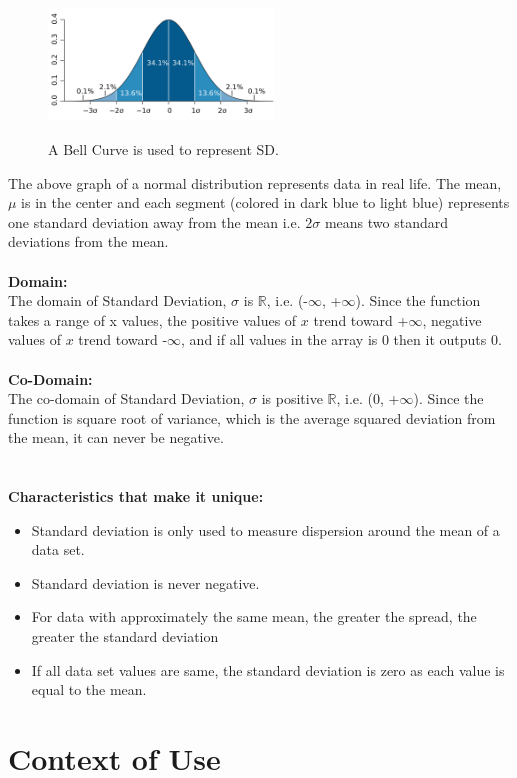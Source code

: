 \documentclass[12pt,letterpaper]{report}
\begin{document}
\begin{figure}[h]
 \centering
 \includegraphics[width= 6cm]{images/Standarddev.png}
  \caption{A Bell Curve is used to represent SD.}\cite{definition}
\end{figure}

\normalsize{The above graph of a normal distribution represents data in real life. The mean, $\mu$ is in the center and each segment (colored in dark blue to light blue) represents one standard deviation away from the mean i.e. $2\sigma$ means two standard deviations from the mean.\cite{Graph}
\\\\
\textbf{Domain:}\\
The domain of Standard Deviation, $\sigma$ is $\mathbb{R}$, i.e. (-$\infty$, +$\infty$). Since the function takes a range of x values, the positive values of $x$ trend toward +$\infty$, negative values of $x$ trend toward -$\infty$, and if all values in the array is 0 then it outputs 0. 
\\
\\\textbf{Co-Domain:}\\
The co-domain of Standard Deviation, $\sigma$ is positive $\mathbb{R}$, i.e. (0, +$\infty$). Since the function is square root of variance, which is the average squared deviation from the mean, it can never be negative.\cite{negativevalues}
\\\\
\\\textbf{Characteristics that make it unique:}
\begin{itemize}
  \item 	Standard deviation is only used to measure dispersion around the mean of a data set.
  \item  	Standard deviation is never negative. 
  \item 	For data with approximately the same mean, the greater the spread, the greater the standard deviation
  \item     If all data set values are same, the standard deviation is zero as each value is equal to the mean. 
\end{itemize}}

{\let\clearpage\relax \chapter{Context of Use}}
 
\end{document}
